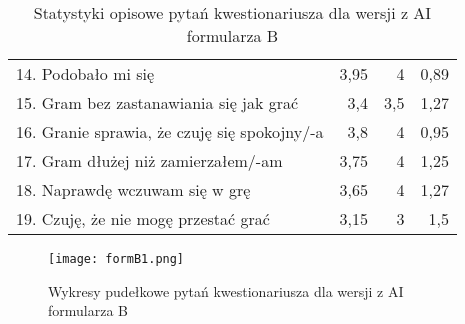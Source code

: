 \begin{table}[h!]
\begin{center}
\begin{tabular}{|m{10em}|r|r|r|}
            14. Podobało mi się                                               & 3,95          & 4       & 0,89           \\
            15. Gram bez zastanawiania się jak grać                           & 3,4           & 3,5     & 1,27           \\
            16. Granie sprawia, \newline że czuję się spokojny/-a             & 3,8           & 4       & 0,95           \\
            17. Gram dłużej \newline niż zamierzałem/-am                      & 3,75          & 4       & 1,25           \\
            18. Naprawdę wczuwam się w grę                                    & 3,65          & 4       & 1,27           \\
            19. Czuję, że nie mogę przestać grać                              & 3,15          & 3       & 1,5            \\
            \hline
        \end{tabular}
    \end{center}
    \caption{Statystyki opisowe pytań kwestionariusza dla wersji z AI formularza B}\label{tab1:appendixB_7}
\end{table}

\begin{figure}[h!]
    \centering
    \texttt{[image: formB1.png]}
    \caption{Wykresy pudełkowe pytań kwestionariusza dla wersji z AI formularza B}
    \label{fig:appendixB_formB1}
\end{figure}

